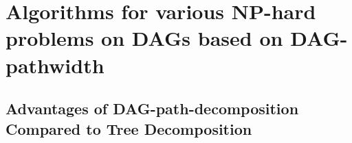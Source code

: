 \documentclass[runningheads]{llncs}
\theoremstyle{plain}
\theoremstyle{definition}
\begin{document}
\begin{comment}
    The pebbling number of $G$ $(\mathsf{Peb}(G))$ is the minimum $space$ over all strategies of $G$.
\end{definition}

For general DAGs, the problem of computing the pebbling number is PSPACE-complete [\cite{art14}]. The Black Pebbling game is used in blockchain technology known as Proof of Space [\cite{art15}]. Proof of Space is a method to prove the amount of free disk space held, where the input DAG corresponds to the free disk space. Moreover, the pebbling number corresponds to the amount of memory used simultaneously. A larger pebbling number indicates greater memory or data usage, making the proof more challenging and thus indicating higher security of the proof.

Additionally, the one-shot Black Pebbling (one-shot BP) is defined by adding the following rule to the Black Pebbling game:

\begin{description}
    \item[Rule 5] Each vertex of the DAG $G$ is pebbled only once.
\end{description}

The pebbling number for one-shot BP can also be defined similarly. For general DAGs, the problem of computing the pebbling number for one-shot BP is NP-hard [\cite{art16}]. In Section 4.3, we demonstrate that one-shot BP is equivalent to the problem of constructing a nice DAG-path-decomposition on DAGs.
\end{comment}






















\section{Algorithms for various NP-hard problems on DAGs based on DAG-pathwidth}\label{chapter3}

\subsection{Advantages of DAG-path-decomposition Compared to Tree Decomposition}
\end{document}
